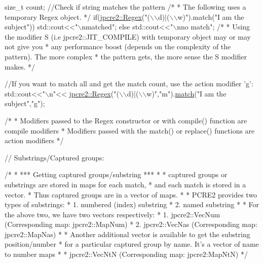 \begin{DoxyCode}
\textcolor{keywordtype}{size\_t} count;
\textcolor{comment}{//Check if string matches the pattern}
\textcolor{comment}{/*}
\textcolor{comment}{ * The following uses a temporary Regex object.}
\textcolor{comment}{ */}
\textcolor{keywordflow}{if}(\hyperlink{classjpcre2_1_1Regex}{jpcre2::Regex}(\textcolor{stringliteral}{"(\(\backslash\)\(\backslash\)d)|(\(\backslash\)\(\backslash\)w)"}).match(\textcolor{stringliteral}{"I am the subject"})) 
    std::cout<<\textcolor{stringliteral}{"\(\backslash\)nmatched"};
\textcolor{keywordflow}{else}
    std::cout<<\textcolor{stringliteral}{"\(\backslash\)nno match"};
\textcolor{comment}{/*}
\textcolor{comment}{ * Using the modifier S (i.e jpcre2::JIT\_COMPILE) with temporary object may or may not give you}
\textcolor{comment}{ * any performance boost (depends on the complexity of the pattern). The more complex }
\textcolor{comment}{ * the pattern gets, the more sense the S modifier makes.}
\textcolor{comment}{ */}

\textcolor{comment}{//If you want to match all and get the match count, use the action modifier 'g':}
std::cout<<\textcolor{stringliteral}{"\(\backslash\)n"}<<
    \hyperlink{classjpcre2_1_1Regex}{jpcre2::Regex}(\textcolor{stringliteral}{"(\(\backslash\)\(\backslash\)d)|(\(\backslash\)\(\backslash\)w)"},\textcolor{stringliteral}{"m"}).\hyperlink{classjpcre2_1_1Regex_ab93775a93a0a537d09b9e9ab4a5a3894_ab93775a93a0a537d09b9e9ab4a5a3894}{match}(\textcolor{stringliteral}{"I am the subject"},\textcolor{stringliteral}{"g"});

\textcolor{comment}{/*}
\textcolor{comment}{ * Modifiers passed to the Regex constructor or with compile() function are compile modifiers}
\textcolor{comment}{ * Modifiers passed with the match() or replace() functions are action modifiers}
\textcolor{comment}{ */}

\textcolor{comment}{// Substrings/Captured groups:}

\textcolor{comment}{/*}
\textcolor{comment}{ * *** Getting captured groups/substring ***}
\textcolor{comment}{ * }
\textcolor{comment}{ * captured groups or substrings are stored in maps for each match,}
\textcolor{comment}{ * and each match is stored in a vector. }
\textcolor{comment}{ * Thus captured groups are in a vector of maps.}
\textcolor{comment}{ * }
\textcolor{comment}{ * PCRE2 provides two types of substrings:}
\textcolor{comment}{ *  1. numbered (index) substring}
\textcolor{comment}{ *  2. named substring}
\textcolor{comment}{ * }
\textcolor{comment}{ * For the above two, we have two vectors respectively:}
\textcolor{comment}{ *  1. jpcre2::VecNum (Corresponding map: jpcre2::MapNum)}
\textcolor{comment}{ *  2. jpcre2::VecNas (Corresponding map: jpcre2::MapNas)}
\textcolor{comment}{ * }
\textcolor{comment}{ * Another additional vector is available to get the substring position/number}
\textcolor{comment}{ * for a particular captured group by name. It's a vector of name to number maps}
\textcolor{comment}{ *  * jpcre2::VecNtN (Corresponding map: jpcre2:MapNtN)}
\textcolor{comment}{ */}


\end{DoxyCode}
